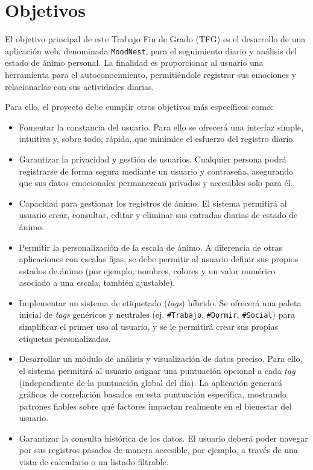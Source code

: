 \section{Objetivos}
\label{sec:objetivos}

El objetivo principal de este Trabajo Fin de Grado (TFG) es el desarrollo de una aplicación web, denominada \texttt{MoodNest}, para el seguimiento diario y análisis del estado de ánimo personal. La finalidad es proporcionar al usuario una herramienta para el autoconocimiento, permitiéndole registrar sus emociones y relacionarlas con sus actividades diarias.

Para ello, el proyecto debe cumplir otros objetivos más específicos como:
\begin{itemize}
    \item Fomentar la constancia del usuario. Para ello se ofrecerá una interfaz simple, intuitiva y, sobre todo, rápida, que minimice el esfuerzo del registro diario.
    
    \item Garantizar la privacidad y gestión de usuarios. Cualquier persona podrá registrarse de forma segura mediante un usuario y contraseña, asegurando que sus datos emocionales permanezcan privados y accesibles solo para él.
    
    \item Capacidad para gestionar los registros de ánimo. El sistema permitirá al usuario crear, consultar, editar y eliminar sus entradas diarias de estado de ánimo.
    
    \item Permitir la personalización de la escala de ánimo. A diferencia de otras aplicaciones con escalas fijas, se debe permitir al usuario definir sus propios estados de ánimo (por ejemplo, nombres, colores y un valor numérico asociado a una escala, también ajustable).
    
    \item Implementar un sistema de etiquetado (\textit{tags}) híbrido. Se ofrecerá una paleta inicial de \textit{tags} genéricos y neutrales (ej. \texttt{\#Trabajo}, \texttt{\#Dormir}, \texttt{\#Social}) para simplificar el primer uso al usuario, y se le permitirá crear sus propias etiquetas personalizadas.

    \item Desarrollar un módulo de análisis y visualización de datos preciso. Para ello, el sistema permitirá al usuario asignar una puntuación opcional a cada \textit{tag} (independiente de la puntuación global del día). La aplicación generará gráficos de correlación basados en esta puntuación específica, mostrando patrones fiables sobre qué factores impactan realmente en el bienestar del usuario.
    
    
    \item Garantizar la consulta histórica de los datos. El usuario deberá poder navegar por sus registros pasados de manera accesible, por ejemplo, a través de una vista de calendario o un listado filtrable.
\end{itemize}
